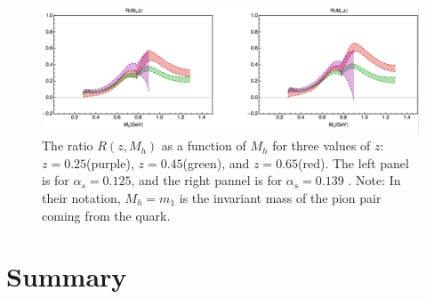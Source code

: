 \documentclass[letterpaper, abstract = on,listof=totoc, bibliography=totoc]{scrreprt}
\begin{document}
 \begin{figure}
\begin{center}
\includegraphics[width = .8\textwidth]{extractionIFF2}
\caption[Extraction of IFF from BELLE data]{The ratio $R(z,M_h)$ as a function of $M_h$ for three values of $z$: $z = 0.25$(purple), $z=0.45$(green), and $z=0.65$(red). The left panel is for $\alpha_s = 0.125$, and the right pannel is for $\alpha_s = 0.139$ \cite{RealEstValTrans}. Note: In their notation, $M_h = m_1$ is the invariant mass of the pion pair coming from the quark.}
\label{fig:extractionIFF}
\end{center}
\end{figure}




\section{Summary}
\end{document}
